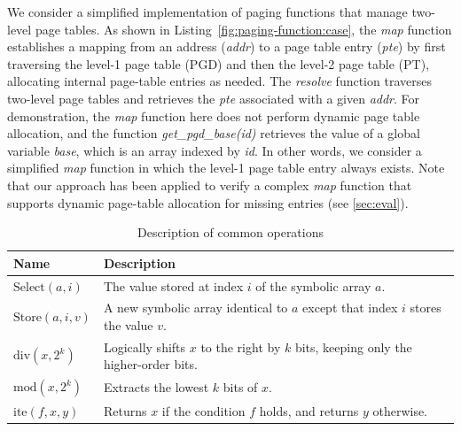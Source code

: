 We consider a simplified implementation of paging functions that manage two-level page tables.  As shown in Listing~\ref{fig:paging-function:case}, the \textit{map} function establishes a mapping from an address (\textit{addr}) to a page table entry (\textit{pte}) by first traversing the level-1 page table (PGD) and then the level-2 page table (PT), allocating internal page-table entries as needed. The \textit{resolve} function traverses two-level page tables and retrieves the \textit{pte} associated with a given \textit{addr}. For demonstration, the \textit{map} function here does not perform dynamic page table allocation, and the function \textit{get\_pgd\_base(id)} retrieves the value of a global variable \textit{base}, which is an array indexed by \textit{id}. In other words, we consider a simplified \textit{map} function in which the level-1 page table entry always exists. Note that our approach has been applied to verify a complex \textit{map} function that supports dynamic page-table allocation for missing entries (see \autoref{sec:eval}).


\begin{table}[t]
\centering
\caption{Description of common operations}
\label{tbl:op}
\footnotesize
\begin{tabular}{ |p{1.3cm}|p{6.30cm}| }
    \hline
    \textbf{Name} & \textbf{Description} \\
    \hline 
     $\text{Select}(a, i)$ & The value stored at index $i$ of the symbolic array $a$.\\
    \hline
    $\text{Store}(a, i, v)$ & A new symbolic array identical to $a$ except that index $i$ stores the value $v$. \\ 
    \hline 
    $\text{div}(x, 2^k)$ & Logically shifts $x$ to the right by 
$k$ bits, keeping only the higher-order bits. \\
    \hline
    $\text{mod}(x, 2^k)$ & Extracts the lowest $k$ bits of $x$. \\ 
    \hline
    $\text{ite}(f, x, y)$ & Returns $x$ if the condition $f$ holds, and returns $y$ otherwise. \\ 
    \hline
\end{tabular}
\end{table}

